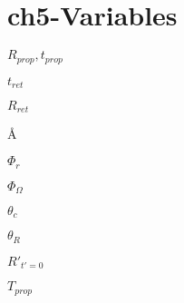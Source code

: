 \section{ch5-Variables}

\noindent $R_{prop}, t_{prop}$ \newline

\noindent $t_{ret}$ \newline

\noindent $R_{ret}$ \newline

\noindent \AA  \newline

\noindent $\Phi_r$ \newline

\noindent $\Phi_{\Omega}$ \newline

\noindent $\theta_c$ \newline

\noindent $\theta_R$ \newline

\noindent $R'_{t'=0}$ \newline

\noindent $T_{prop}$ \newline